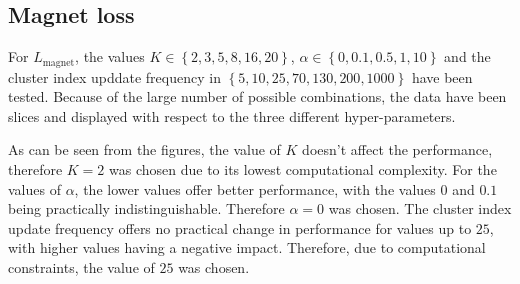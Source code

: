 \subsection{Magnet loss}
For \( L_\mathrm{magnet} \), the values \( K \in \left\{ 2, 3, 5, 8, 16, 20 \right\} \), \( \alpha \in \left\{ 0, 0.1, 0.5, 1, 10 \right\} \) and the cluster index upddate frequency in \( \left\{ 5, 10, 25, 70, 130, 200, 1000 \right\} \) have been tested. Because of the large number of possible combinations, the data have been slices and displayed with respect to the three different hyper-parameters. 

As can be seen from the figures, the value of \( K \) doesn't affect the performance, therefore \( K = 2 \) was chosen due to its lowest computational complexity. For the values of \( \alpha \), the lower values offer better performance, with the values \( 0 \) and \( 0.1 \) being practically indistinguishable. Therefore \( \alpha = 0 \) was chosen. The cluster index update frequency offers no practical change in performance for values up to \( 25 \), with higher values having a negative impact. Therefore, due to computational constraints, the value of \( 25 \) was chosen.
